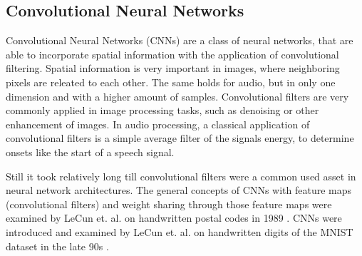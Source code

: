 
\subsection{Convolutional Neural Networks}\label{sec:prev_nn_cnn}
Convolutional Neural Networks (CNNs) are a class of neural networks, that are able to incorporate spatial information with the application of convolutional filtering.
Spatial information is very important in images, where neighboring pixels are releated to each other.
The same holds for audio, but in only one dimension and with a higher amount of samples.
Convolutional filters are very commonly applied in image processing tasks, such as denoising or other enhancement of images.
In audio processing, a classical application of convolutional filters is a simple average filter of the signals energy, to determine onsets like the start of a speech signal.

Still it took relatively long till convolutional filters were a common used asset in neural network architectures.
The general concepts of CNNs with feature maps (convolutional filters) and weight sharing through those feature maps
were examined by LeCun et. al. on handwritten postal codes in 1989 \cite{LeCun1989_Generalization}.
CNNs were introduced and examined by LeCun et. al. on handwritten digits of the MNIST dataset in the late 90s
\cite{LeCun1998}.



  
